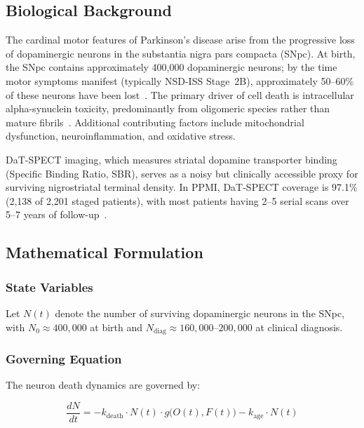 \subsection{Biological Background}

The cardinal motor features of Parkinson's disease arise from the progressive loss of dopaminergic neurons in the substantia nigra pars compacta (SNpc). At birth, the SNpc contains approximately 400,000 dopaminergic neurons; by the time motor symptoms manifest (typically NSD-ISS Stage~2B), approximately 50--60\% of these neurons have been lost~\cite{kalia2015}. The primary driver of cell death is intracellular alpha-synuclein toxicity, predominantly from oligomeric species rather than mature fibrils~\cite{brundin2010}. Additional contributing factors include mitochondrial dysfunction, neuroinflammation, and oxidative stress.

DaT-SPECT imaging, which measures striatal dopamine transporter binding (Specific Binding Ratio, SBR), serves as a noisy but clinically accessible proxy for surviving nigrostriatal terminal density. In PPMI, DaT-SPECT coverage is 97.1\% (2,138 of 2,201 staged patients), with most patients having 2--5 serial scans over 5--7 years of follow-up~\cite{marek2011}.

\subsection{Mathematical Formulation}

\subsubsection{State Variables}

Let $N(t)$ denote the number of surviving dopaminergic neurons in the SNpc, with $N_0 \approx 400{,}000$ at birth and $N_\text{diag} \approx 160{,}000$--$200{,}000$ at clinical diagnosis.

\subsubsection{Governing Equation}

The neuron death dynamics are governed by:

\begin{equation}
\frac{dN}{dt} = -k_\text{death} \cdot N(t) \cdot g\bigl(O(t), F(t)\bigr) - k_\text{age} \cdot N(t)
\label{eq:dNdt}
\end{equation}

